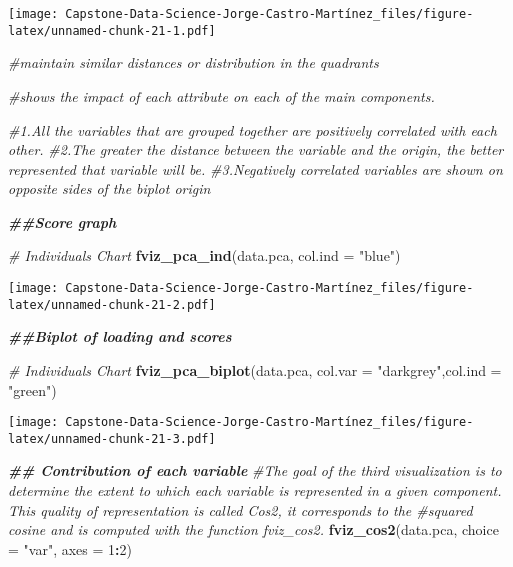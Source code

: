 \documentclass[
]{article}
\newenvironment{Shaded}{\begin{snugshade}}{\end{snugshade}}
\newcommand{\AttributeTok}[1]{\textcolor[rgb]{0.13,0.29,0.53}{#1}}
\newcommand{\CommentTok}[1]{\textcolor[rgb]{0.56,0.35,0.01}{\textit{#1}}}
\newcommand{\DecValTok}[1]{\textcolor[rgb]{0.00,0.00,0.81}{#1}}
\newcommand{\DocumentationTok}[1]{\textcolor[rgb]{0.56,0.35,0.01}{\textbf{\textit{#1}}}}
\newcommand{\FunctionTok}[1]{\textcolor[rgb]{0.13,0.29,0.53}{\textbf{#1}}}
\newcommand{\NormalTok}[1]{#1}
\newcommand{\SpecialCharTok}[1]{\textcolor[rgb]{0.81,0.36,0.00}{\textbf{#1}}}
\newcommand{\StringTok}[1]{\textcolor[rgb]{0.31,0.60,0.02}{#1}}
\begin{document}
\texttt{[image: Capstone-Data-Science-Jorge-Castro-Martínez\_files/figure-latex/unnamed-chunk-21-1.pdf]}

\begin{Shaded}
\begin{Highlighting}[]
\CommentTok{\#maintain similar distances or distribution in the quadrants}

\CommentTok{\#shows the impact of each attribute on each of the main components.}

\CommentTok{\#1.All the variables that are grouped together are positively correlated with each other.}
\CommentTok{\#2.The greater the distance between the variable and the origin, the better represented that variable will be.}
\CommentTok{\#3.Negatively correlated variables are shown on opposite sides of the biplot origin}

\DocumentationTok{\#\#Score graph}


\CommentTok{\# Individuals Chart}
\FunctionTok{fviz\_pca\_ind}\NormalTok{(data.pca, }\AttributeTok{col.ind =} \StringTok{"blue"}\NormalTok{)}
\end{Highlighting}
\end{Shaded}

\texttt{[image: Capstone-Data-Science-Jorge-Castro-Martínez\_files/figure-latex/unnamed-chunk-21-2.pdf]}

\begin{Shaded}
\begin{Highlighting}[]
\DocumentationTok{\#\#Biplot of loading and scores}

\CommentTok{\# Individuals Chart}
\FunctionTok{fviz\_pca\_biplot}\NormalTok{(data.pca, }\AttributeTok{col.var =} \StringTok{"darkgrey"}\NormalTok{,}\AttributeTok{col.ind =} \StringTok{"green"}\NormalTok{)}
\end{Highlighting}
\end{Shaded}

\texttt{[image: Capstone-Data-Science-Jorge-Castro-Martínez\_files/figure-latex/unnamed-chunk-21-3.pdf]}

\begin{Shaded}
\begin{Highlighting}[]
\DocumentationTok{\#\# Contribution of each variable}
\CommentTok{\#The goal of the third visualization is to determine the extent to which each variable is represented in a given component. This quality of representation is called Cos2, it corresponds to the \#squared cosine and is computed with the function fviz\_cos2.}
\FunctionTok{fviz\_cos2}\NormalTok{(data.pca, }\AttributeTok{choice =} \StringTok{"var"}\NormalTok{, }\AttributeTok{axes =} \DecValTok{1}\SpecialCharTok{:}\DecValTok{2}\NormalTok{)}
\end{Highlighting}
\end{Shaded}
\end{document}
